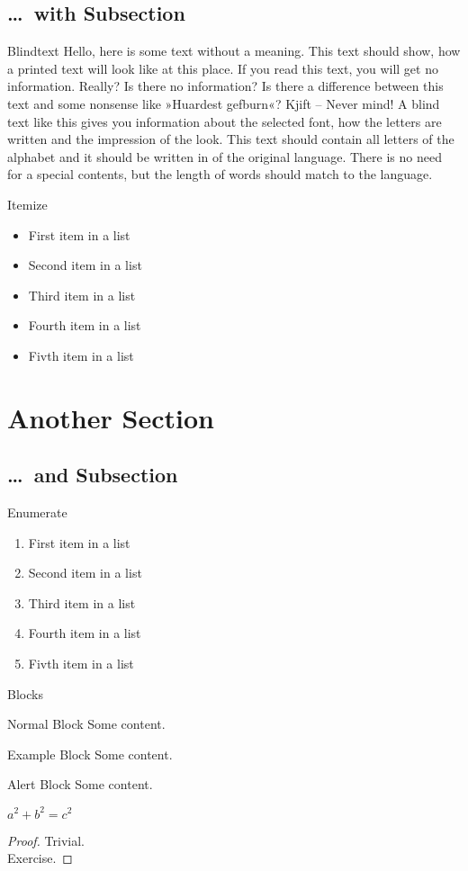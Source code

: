 \documentclass[9pt,english]{beamer}
\begin{document}
\subsection{\ldots\ with Subsection}
\begin{frame}{Blindtext}
Hello, here is some text without a meaning. This text should show, how a
printed text will look like at this place. If you read this text, you will
get no information. Really? Is there no information? Is there a difference
between this text and some nonsense like »Huardest gefburn«? Kjift – Never
mind! A blind text like this gives you information about the selected font,
how the letters are written and the impression of the look. This text
should contain all letters of the alphabet and it should be written in of
the original language. There is no need for a special contents, but the
length of words should match to the language.
\end{frame}
\begin{frame}{Itemize}
\begin{itemize}
  \item First item in a list
  \item Second item in a list
  \item Third item in a list
  \item Fourth item in a list
  \item Fivth item in a list
\end{itemize}
\end{frame}
\section{Another Section}
\subsection{\ldots\ and Subsection}
\begin{frame}{Enumerate}
\begin{enumerate}
  \item First item in a list
  \item Second item in a list
  \item Third item in a list
  \item Fourth item in a list
  \item Fivth item in a list
\end{enumerate}
\end{frame}
\begin{frame}{Blocks}
  \begin{block}{Normal Block}
    Some content.
  \end{block}
  \begin{exampleblock}{Example Block}
    Some content.
  \end{exampleblock}
  \begin{alertblock}{Alert Block}
    Some content.
  \end{alertblock}
  \begin{theorem}
    $a^2+b^2=c^2$
  \end{theorem}
  \begin{proof}
    Trivial. \\
    Exercise.
  \end{proof}
\end{frame}
\end{document}
